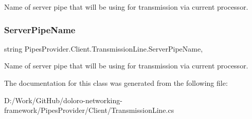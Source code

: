Name of server pipe that will be using for transmission via current processor. 

\mbox{\label{class_pipes_provider_1_1_client_1_1_transmission_line_aa7e8a85952e05718b1a0ff96b9874766}} 
\subsubsection{\texorpdfstring{Server\+Pipe\+Name}{ServerPipeName}}
{\footnotesize\ttfamily string Pipes\+Provider.\+Client.\+Transmission\+Line.\+Server\+Pipe\+Name\hspace{0.3cm}{\ttfamily [get]}, {}}



Name of server pipe that will be using for transmission via current processor. 



The documentation for this class was generated from the following file\+:\begin{DoxyCompactItemize}
\item 
D\+:/\+Work/\+Git\+Hub/doloro-\/networking-\/framework/\+Pipes\+Provider/\+Client/Transmission\+Line.\+cs\end{DoxyCompactItemize}
